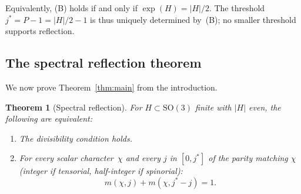 \documentclass[12pt]{article}
\newtheorem{theorem}{Theorem}[section]
\theoremstyle{definition}
\theoremstyle{remark}
\newcommand{\SO}{\mathrm{SO}}
\begin{document}
\noindent
Equivalently, (B) holds if and only if $\exp(H) = |H|/2$.
The threshold $j^* = P - 1 = |H|/2 - 1$ is thus uniquely
determined by~(B); no smaller threshold supports reflection.

\subsection{The spectral reflection theorem}
\label{sec:duality-theorem}

We now prove Theorem~\ref{thm:main} from the introduction.

\begin{theorem}[Spectral reflection]
  \label{thm:duality}
  For $H \subset \SO(3)$ finite with $|H|$ even, the
  following are equivalent:
  \begin{enumerate}
    \item[\textup{(B)}] The divisibility condition holds.
    \item[\textup{(C)}] For every scalar character~$\chi$
      and every $j$ in $[0, j^*]$ of the parity matching
      $\chi$
      \textup{(}integer if tensorial, half-integer if
      spinorial\textup{)}:
      \begin{equation}
        \label{eq:duality}
        m(\chi, j) + m(\chi, j^* - j) = 1.
      \end{equation}
  \end{enumerate}
\end{theorem}
\end{document}
